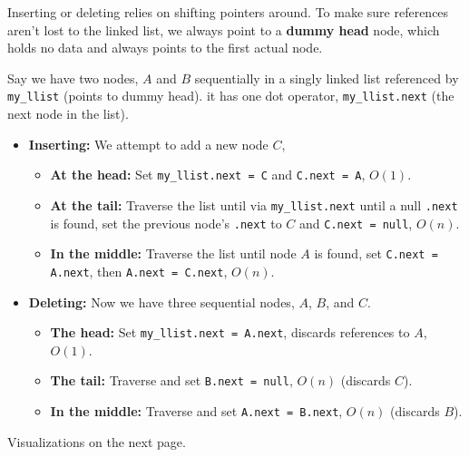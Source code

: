 \begin{Def}

    \label{def:insertion_deletion_linked_list}

    Inserting or deleting relies on shifting pointers around. To make sure references aren't lost to
    the linked list, we always point to a \textbf{dummy head} node, which holds no data and
    always points to the first actual node.

    Say we have two nodes, $A$ and $B$ sequentially in a singly linked list referenced by \texttt{my\_llist} (points to dummy head).
    it has one dot operator, \texttt{my\_llist.next} (the next node in the list).
    \begin{itemize}
        \item \textbf{Inserting:} We attempt to add a new node $C$,
         \begin{itemize}
            \item \textbf{At the head:} Set \texttt{my\_llist.next = C} and \texttt{C.next = A}, $O(1)$.
            \item \textbf{At the tail:} Traverse the list until via \texttt{my\_llist.next} until a null \texttt{.next}
            is found, set the previous node's \texttt{.next} to $C$ and \texttt{C.next = null}, $O(n)$.
            \item \textbf{In the middle:} Traverse the list until node $A$ is found,
            set \texttt{C.next = A.next}, then \texttt{A.next = C.next}, $O(n)$.
        \end{itemize}
        \item \textbf{Deleting:} Now we have three sequential nodes, $A$, $B$, and $C$.
        \begin{itemize}
            \item \textbf{The head:} Set \texttt{my\_llist.next = A.next}, discards references to $A$, $O(1)$.
            \item \textbf{The tail:} Traverse and set \texttt{B.next = null}, $O(n)$ (discards $C$).
            \item \textbf{In the middle:} Traverse and set \texttt{A.next = B.next}, $O(n)$ (discards $B$).
        \end{itemize}
    \end{itemize}
\end{Def}
\noindent
Visualizations on the next page.

\newpage 

